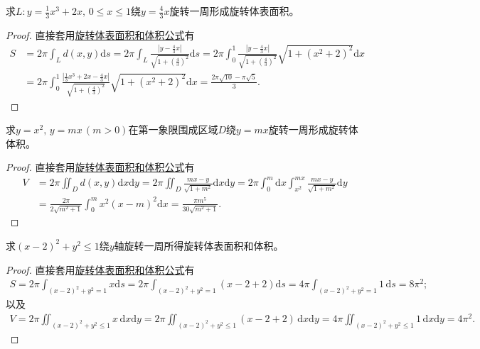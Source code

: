 \documentclass[../../main.tex]{subfiles}%
\begin{document}
\begin{example}
求$L:y=\frac{1}{3}x^3+2x,\,0\leqslant x\leqslant 1$绕$y=\frac{4}{3}x$旋转一周形成旋转体表面积。
\end{example}
\begin{proof}
直接套用\hyperref[theorem:旋转体表面积和体积公式]{旋转体表面积和体积公式}有
\begin{align*}
S &= 2\pi \int_L d(x,y)\mathrm{d}s = 2\pi \int_L \frac{\left|y-\frac{4}{3}x\right|}{\sqrt{1+\left(\frac{4}{3}\right)^2}}\mathrm{d}s = 2\pi \int_{0}^{1} \frac{\left|y-\frac{4}{3}x\right|}{\sqrt{1+\left(\frac{4}{3}\right)^2}}\sqrt{1+(x^2+2)^2}\mathrm{d}x \\
&= 2\pi \int_{0}^{1} \frac{\left|\frac{1}{3}x^3+2x-\frac{4}{3}x\right|}{\sqrt{1+\left(\frac{4}{3}\right)^2}}\sqrt{1+(x^2+2)^2}\mathrm{d}x = \frac{2\pi\sqrt{10}-\pi\sqrt{5}}{3}.
\end{align*}\end{proof}

\begin{example}
求$y=x^2,\,y=mx\,(m>0)$在第一象限围成区域$D$绕$y=mx$旋转一周形成旋转体体积。
\end{example}
\begin{proof}
直接套用\hyperref[theorem:旋转体表面积和体积公式]{旋转体表面积和体积公式}有
\begin{align*}
V &= 2\pi \iint_D d(x,y)\mathrm{d}x\mathrm{d}y = 2\pi \iint_D \frac{mx-y}{\sqrt{1+m^2}}\mathrm{d}x\mathrm{d}y = 2\pi \int_{0}^{m}\mathrm{d}x \int_{x^2}^{mx} \frac{mx-y}{\sqrt{1+m^2}}\mathrm{d}y
\\
&= \frac{2\pi}{2\sqrt{m^2+1}} \int_{0}^{m} x^2(x-m)^2 \mathrm{d}x 
= \frac{\pi m^5}{30\sqrt{m^2+1}}.
\end{align*}\end{proof}

\begin{example}
求$(x-2)^2+y^2 \leqslant 1$绕$y$轴旋转一周所得旋转体表面积和体积。
\end{example}
\begin{proof}
直接套用\hyperref[theorem:旋转体表面积和体积公式]{旋转体表面积和体积公式}有
\begin{align*}
S = 2\pi \int_{(x-2)^2+y^2=1} x\mathrm{d}s = 2\pi \int_{(x-2)^2+y^2=1} (x-2+2)\mathrm{d}s 
=4\pi \int_{(x-2)^2+y^2=1}1\,\mathrm{d}s=8\pi^2;
\end{align*}
以及
\begin{align*}
V = 2\pi \iint_{(x-2)^2+y^2\leqslant1}x\,\mathrm{d}x\mathrm{d}y
=2\pi \iint_{(x-2)^2+y^2\leqslant1}(x-2+2)\,\mathrm{d}x\mathrm{d}y 
=4\pi \iint_{(x-2)^2+y^2\leqslant1}1\,\mathrm{d}x\mathrm{d}y=4\pi^2.
\end{align*}\end{proof}
\end{document}
